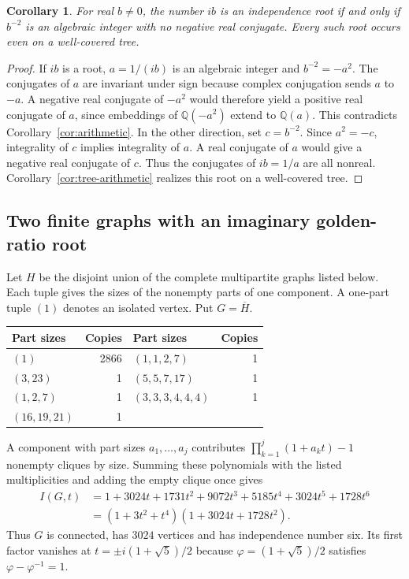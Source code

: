 \documentclass[11pt,a4paper]{article}
\newtheorem{corollary}[theorem]{Corollary}
\begin{document}
\begin{corollary}\label{cor:imaginary-arithmetic}
For real $b\ne0$, the number $ib$ is an independence root if and only if $b^{-2}$ is an algebraic integer with no negative real conjugate. Every such root occurs even on a well-covered tree.
\end{corollary}
\begin{proof}
If $ib$ is a root, $a=1/(ib)$ is an algebraic integer and $b^{-2}=-a^2$. The conjugates of $a$ are invariant under sign because complex conjugation sends $a$ to $-a$. A negative real conjugate of $-a^2$ would therefore yield a positive real conjugate of $a$, since embeddings of $\mathbb Q(-a^2)$ extend to $\mathbb Q(a)$. This contradicts Corollary~\ref{cor:arithmetic}. In the other direction, set $c=b^{-2}$. Since $a^2=-c$, integrality of $c$ implies integrality of $a$. A real conjugate of $a$ would give a negative real conjugate of $c$. Thus the conjugates of $ib=1/a$ are all nonreal. Corollary~\ref{cor:tree-arithmetic} realizes this root on a well-covered tree.
\end{proof}

\subsection{Two finite graphs with an imaginary golden-ratio root}

Let $H$ be the disjoint union of the complete multipartite graphs listed
below. Each tuple gives the sizes of the nonempty parts of one component.
A one-part tuple $(1)$ denotes an isolated vertex. Put $G=\overline H$.

\begin{center}
\begin{tabular}{lr@{\qquad}lr}
\hline
Part sizes & Copies & Part sizes & Copies\\
\hline
$(1)$ & 2866 & $(1,1,2,7)$ & 1\\
$(3,23)$ & 1 & $(5,5,7,17)$ & 1\\
$(1,2,7)$ & 1 & $(3,3,3,4,4,4)$ & 1\\
$(16,19,21)$ & 1 & & \\
\hline
\end{tabular}
\end{center}

A component with part sizes $a_1,\ldots,a_j$ contributes
$\prod_{k=1}^j(1+a_k t)-1$ nonempty cliques by size. Summing these
polynomials with the listed multiplicities and adding the empty clique
once gives
\begin{align*}
 I(G,t)&=1+3024t+1731t^2+9072t^3+5185t^4+3024t^5+1728t^6\\
       &=(1+3t^2+t^4)(1+3024t+1728t^2).
\end{align*}
Thus $G$ is connected, has $3024$ vertices and has independence number
six. Its first factor vanishes at $t=\pm i(1+\sqrt5)/2$ because
$\varphi=(1+\sqrt5)/2$ satisfies $\varphi-\varphi^{-1}=1$.
\end{document}
